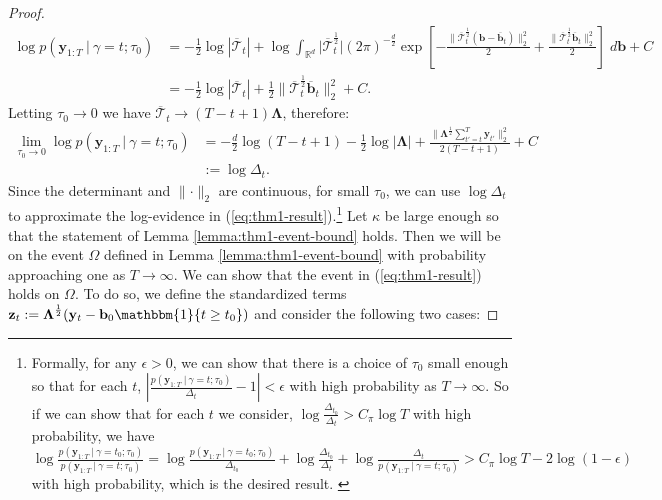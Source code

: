 \begin{proof}
\begin{align*}
    \log p(\mathbf{y}_{1:T} \:|\:\gamma = t ; \tau_0)
    &=  -\frac{1}{2}\log |\overline{\boldsymbol{\mathcal{T}}}_t| + \log \int_{\mathbb{R}^d} \big|\overline{\boldsymbol{\mathcal{T}}}^{\frac{1}{2}}_t\big|(2\pi)^{-\frac{d}{2}}\exp\left[-\frac{\lVert\overline{\boldsymbol{\mathcal{T}}}^{\frac{1}{2}}_t(\mathbf{b} - \overline{\mathbf{b}}_t)\rVert_2^2}{2} + \frac{\lVert \overline{\boldsymbol{\mathcal{T}}}^{\frac{1}{2}}_t \overline{\mathbf{b}}_t\rVert_2^2}{2}\right] \; d\mathbf{b} + C\\
    &= -\frac{1}{2}\log |\overline{\boldsymbol{\mathcal{T}}}_t| + \frac{1}{2}\lVert \overline{\boldsymbol{\mathcal{T}}}^{\frac{1}{2}}_t \overline{\mathbf{b}}_t\rVert_2^2 + C.
\end{align*}
Letting $\tau_0 \to 0$ we have $\overline{\boldsymbol{\mathcal{T}}}_t \to (T-t + 1)\boldsymbol{\Lambda}$, therefore: 
\begin{align*}
    \lim_{\tau_0\to 0} \log p(\mathbf{y}_{1:T} \:|\: \gamma = t; \tau_0) &= -\frac{d}{2}\log(T - t + 1) - \frac{1}{2}\log |\boldsymbol{\Lambda}| + \frac{\lVert \boldsymbol{\Lambda}^{\frac{1}{2}}\sum_{t'=t}^T\mathbf{y}_{t'}\rVert_2^2}{2(T-t+1)}+ C \\
    &:= \log \Delta_t.
\end{align*}
Since the determinant and $\lVert \cdot \rVert_2$ are continuous, for small $\tau_0$, we can use $\log \Delta_t$ to approximate the log-evidence in (\ref{eq:thm1-result}).\footnote{Formally, for any $\epsilon > 0$, we can show that there is a choice of $\tau_0$ small enough so that for each $t$, $|\frac{p(\mathbf{y}_{1:T} \:|\:\gamma = t ; \tau_0)}{\Delta_{t}}-1| < \epsilon$ with high probability as $T \to \infty$. So if we can show that for each $t$ we consider, $\log \frac{\Delta_{t_0}}{\Delta_t} > C_\pi \log T$ with high probability, we have $\log \frac{p(\mathbf{y}_{1:T} \:|\:\gamma = t_0 ; \tau_0)}{p(\mathbf{y}_{1:T} \:|\:\gamma = t ; \tau_0)} = \log\frac{p(\mathbf{y}_{1:T} \:|\:\gamma = t_0 ; \tau_0)}{\Delta_{t_0}} + \log \frac{\Delta_{t_0}}{\Delta_t} + \log \frac{\Delta_t}{p(\mathbf{y}_{1:T} \:|\:\gamma = t ; \tau_0)} > C_\pi\log T -2 \log(1-\epsilon)$ with high probability, which is the desired result. \label{fn:approx}} Let $\kappa$ be large enough so that the statement of Lemma \ref{lemma:thm1-event-bound} holds. Then we will be on the event $\Omega$ defined in Lemma \ref{lemma:thm1-event-bound} with probability approaching one as $T\to\infty$. We can show that the event in (\ref{eq:thm1-result}) holds on $\Omega$. To do so, we define the standardized terms $\mathbf{z}_t := \boldsymbol{\Lambda}^{\frac{1}{2}}(\mathbf{y}_t - \mathbf{b}_0\mathbbm{1}\{t\geq t_0\})$ and consider the following two cases:


\end{proof}
